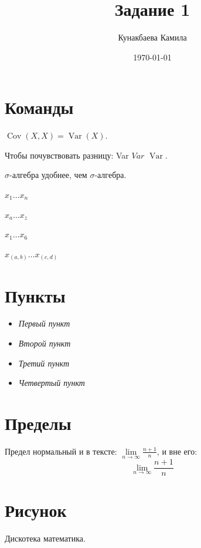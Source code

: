 \documentclass[12pt, a4paper]{article}
\author{Кунакбаева Камила}
\title{Задание 1}
\date{\today}
\DeclareMathOperator{\Var}{Var}
\DeclareMathOperator{\Cov}{Cov}
\def \s{\ensuremath{\sigma}}
\newcommand{\xdots}{\ensuremath{x_1 \ldots x_n}}
\newcommand{\com}[2]{\ensuremath{x_{#1} \ldots x_{#2}}}
\newcommand{\llim}[3]{\lim\limits_{{#1}\to {#2}}{#3}}
\begin{document}
\maketitle

\section{Команды}

$\Cov(X,X)=\Var(X)$.

Чтобы почувствовать разницу: Var $Var$ $\Var$.

\s -алгебра удобнее, чем $\sigma$-алгебра.

\xdots

\com{a}{z}

\com{1}{6}

\com{(a,b)}{(c,d)}

\section{Пункты}

\begin{itemize}
\item \textit{Первый пункт}
\item \textit{Второй пункт}
\item \textit{Третий пункт}
\item \textit{Четвертый пункт}
\end{itemize}

\section{Пределы}

Предел нормальный и в тексте: $\llim{n}{\infty}{\frac{n+1}{n}}$, и вне его:
\[\llim{n}{\infty}{\frac{n+1}{n}}\]

\section{Рисунок}

Дискотека математика.
\end{document}
